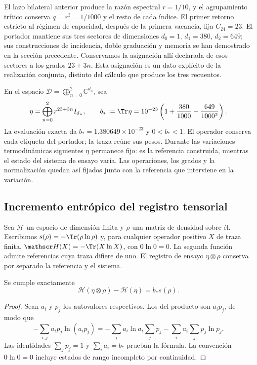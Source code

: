 El lazo bilateral anterior produce la razón espectral $r=1/10$, y el
agrupamiento trítico conserva $q=r^3=1/1000$ y el resto de cada índice.
El primer retorno estricto al régimen de capacidad, después de la primera
vacancia, fija $C_{24}=23$. El portador mantiene sus tres sectores de
dimensiones $d_0=1$, $d_1=380$, $d_2=649$; sus construcciones de
incidencia, doble graduación y memoria se han demostrado en la sección
precedente. Conservamos la asignación allí declarada de esos sectores a
los grados $23+3n$. Esta asignación es un dato explícito de la realización
conjunta, distinto del cálculo que produce los tres recuentos.

En el espacio $\mathcal D=\bigoplus_{n=0}^2\mathbb C^{d_n}$, sea
\begin{equation}
 \eta=\bigoplus_{n=0}^2r^{23+3n}I_{d_n},\qquad
 b_*:=\Tr\eta
 =10^{-23}\left(1+\frac{380}{1000}+\frac{649}{1000^2}\right).
 \label{eq:ii-ter27-eta}
\end{equation}
La evaluación exacta da $b_*=1.380649\times10^{-23}$ y $0<b_*<1$.
El operador conserva cada etiqueta del portador; la traza reúne sus pesos.
Durante las variaciones termodinámicas siguientes $\eta$ permanece fijo:
es la referencia construida, mientras el estado del sistema de ensayo varía.
Las operaciones, los grados y la normalización quedan así fijados junto
con la referencia que interviene en la variación.

\subsection{Incremento entrópico del registro tensorial}
\label{subsec:ii-ter27-tensor}

Sea $\mathcal H$ un espacio de dimensión finita y $\rho$ una matriz de
densidad sobre él. Escribimos $s(\rho)=-\Tr(\rho\ln\rho)$ y, para
cualquier operador positivo $X$ de traza finita,
$\mathscr H(X)=-\Tr(X\ln X)$, con $0\ln0=0$. La segunda función
admite referencias cuya traza difiere de uno. El registro de ensayo
$\eta\otimes\rho$ conserva por separado la referencia y el sistema.

\begin{theorem}
\label{thm:ii-ter27-tensor}
Se cumple exactamente
\begin{equation}
 \mathscr H(\eta\otimes\rho)-\mathscr H(\eta)=b_*s(\rho).
 \label{eq:ii-ter27-tensor}
\end{equation}
\end{theorem}
\begin{proof}
Sean $a_i$ y $p_j$ los autovalores respectivos. Los del producto son
$a_ip_j$, de modo que
\[
 -\sum_{i,j}a_ip_j\ln(a_ip_j)
 =-\sum_i a_i\ln a_i\sum_jp_j
   -\sum_i a_i\sum_jp_j\ln p_j.
\]
Las identidades $\sum_jp_j=1$ y $\sum_i a_i=b_*$ prueban la fórmula.
La convención $0\ln0=0$ incluye estados de rango incompleto por continuidad.
\end{proof}

